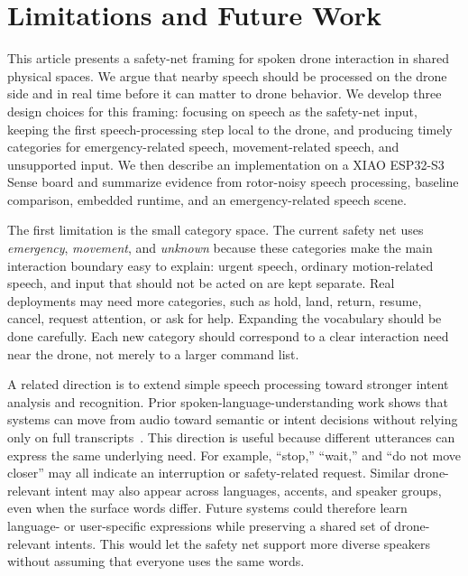 \section{Limitations and Future Work}

This article presents a safety-net framing for spoken drone interaction in shared physical spaces. We argue that nearby speech should be processed on the drone side and in real time before it can matter to drone behavior. We develop three design choices for this framing: focusing on speech as the safety-net input, keeping the first speech-processing step local to the drone, and producing timely categories for emergency-related speech, movement-related speech, and unsupported input. We then describe an implementation on a XIAO ESP32-S3 Sense board and summarize evidence from rotor-noisy speech processing, baseline comparison, embedded runtime, and an emergency-related speech scene.

The first limitation is the small category space. The current safety net uses \emph{emergency}, \emph{movement}, and \emph{unknown} because these categories make the main interaction boundary easy to explain: urgent speech, ordinary motion-related speech, and input that should not be acted on are kept separate. Real deployments may need more categories, such as hold, land, return, resume, cancel, request attention, or ask for help. Expanding the vocabulary should be done carefully. Each new category should correspond to a clear interaction need near the drone, not merely to a larger command list.

A related direction is to extend simple speech processing toward stronger intent analysis and recognition. Prior spoken-language-understanding work shows that systems can move from audio toward semantic or intent decisions without relying only on full transcripts~\cite{haghani2018audio_semantics,lugosch19_interspeech,kuo20_interspeech,le2022deliberation}. This direction is useful because different utterances can express the same underlying need. For example, ``stop,'' ``wait,'' and ``do not move closer'' may all indicate an interruption or safety-related request. Similar drone-relevant intent may also appear across languages, accents, and speaker groups, even when the surface words differ. Future systems could therefore learn language- or user-specific expressions while preserving a shared set of drone-relevant intents. This would let the safety net support more diverse speakers without assuming that everyone uses the same words.

